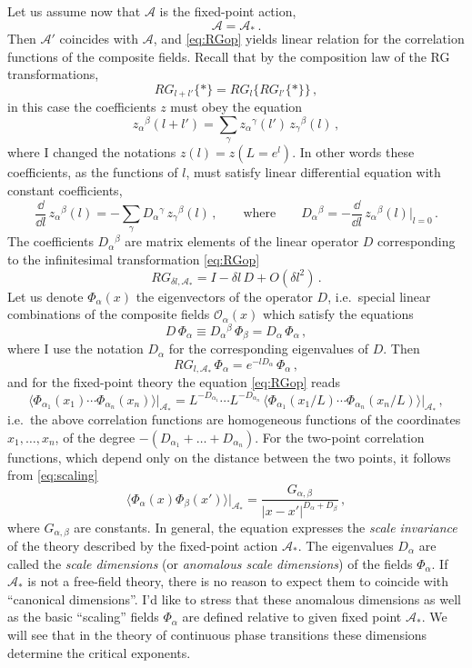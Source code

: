 Let us assume now that $\mathcal A$ is the fixed-point action,
\[
\mathcal A=\mathcal A_*\,.
\]
Then $\mathcal A'$ coincides with $\mathcal A$, and \eqref{eq:RGop} yields linear
relation for the correlation functions of the composite fields. Recall that by the
composition law of the RG transformations,
\[
RG_{l+l'}\{*\}=RG_l\{RG_{l'}\{*\}\}\,,
\]
in this case the coefficients $z$ must obey the equation
\[
z_\alpha{}^\beta(l+l')=\sum_\gamma z_\alpha{}^\gamma(l')\,z_\gamma{}^\beta(l)\,,
\]
where I changed the notations $z(l)=z(L=e^l)$. In other words these coefficients,
as the functions of $l$, must satisfy linear differential equation with constant
coefficients,
\[
\frac{\dd}{\dd l}\,z_\alpha{}^\beta(l)=-\sum_\gamma D_\alpha{}^\gamma\,z_\gamma{}^\beta(l)\,,
\qquad\text{where}\qquad
D_\alpha{}^\beta=-\frac{\dd}{\dd l}\,z_\alpha{}^\beta(l)\Big|_{l=0}\,.
\]
The coefficients $D_\alpha{}^\beta$ are matrix elements of the linear operator $D$
corresponding to the infinitesimal transformation \eqref{eq:RGop}
\[
RG_{\delta l,\mathcal A_*}=I-\delta l\,D+O(\delta l^2)\,.
\]
Let us denote $\Phi_\alpha(x)$ the eigenvectors of the operator $D$, i.e.\ special
linear combinations of the composite fields $\mathcal O_\alpha(x)$ which satisfy
the equations
\[
D\,\Phi_\alpha\equiv D_\alpha{}^\beta\,\Phi_\beta=D_\alpha\,\Phi_\alpha\,,
\]
where I use the notation $D_\alpha$ for the corresponding eigenvalues of $D$. Then
\[
RG_{l,\mathcal A_*}\,\Phi_\alpha=e^{-lD_\alpha}\,\Phi_\alpha\,,
\]
and for the fixed-point theory the equation \eqref{eq:RGop} reads
\begin{equation}\label{eq:scaling}
\bigl\langle\Phi_{\alpha_1}(x_1)\cdots\Phi_{\alpha_n}(x_n)\bigr\rangle\big|_{\mathcal A_*}
=L^{-D_{\alpha_1}}\cdots L^{-D_{\alpha_n}}\,\bigl\langle\Phi_{\alpha_1}(x_1/L)\cdots\Phi_{\alpha_n}(x_n/L)\bigr\rangle\big|_{\mathcal A_*}\,,
\end{equation}
i.e.\ the above correlation functions are homogeneous functions of the coordinates
$x_1,\dots,x_n$, of the degree $-(D_{\alpha_1}+\dots+D_{\alpha_n})$. For the
two-point correlation functions, which depend only on the distance between the two
points, it follows from \eqref{eq:scaling}
\[
\bigl\langle\Phi_\alpha(x)\Phi_\beta(x')\bigr\rangle\big|_{\mathcal A_*}=\frac{G_{\alpha,\beta}}{|x-x'|^{D_\alpha+D_\beta}}\,,
\]
where $G_{\alpha,\beta}$ are constants. In general, the equation expresses the
\emph{scale invariance} of the theory described by the fixed-point action
$\mathcal A_*$. The eigenvalues $D_\alpha$ are called the \emph{scale dimensions}
(or \emph{anomalous scale dimensions}) of the fields $\Phi_\alpha$. If
$\mathcal A_*$ is not a free-field theory, there is no reason to expect them to
coincide with ``canonical dimensions''. I'd like to stress that these anomalous
dimensions as well as the basic ``scaling'' fields $\Phi_\alpha$ are defined
relative to given fixed point $\mathcal A_*$. We will see that in the theory of
continuous phase transitions these dimensions determine the critical exponents.

